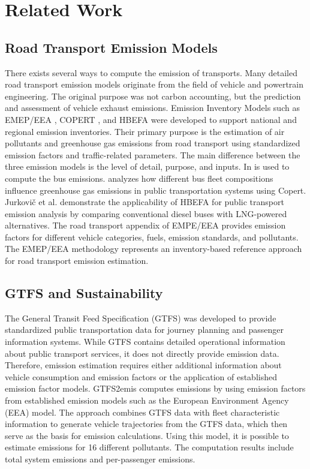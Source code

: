 \chapter{Related Work}
\label{chap:related_work}



\section{Road Transport Emission Models}
There exists several ways to compute the emission of transports. Many detailed road transport emission models originate from the field of vehicle and powertrain engineering. The original purpose was not carbon accounting, but the prediction and assessment of vehicle exhaust emissions. 
Emission Inventory Models such as EMEP/EEA \cite{emep_eea_guidebook_2023}, COPERT \cite{copert}, and HBEFA \cite{hbefa42} were developed to support national and regional emission inventories. Their primary purpose is the estimation of air pollutants and greenhouse gas emissions from road transport using standardized emission factors and traffic-related parameters. The main difference between the three emission models is the level of detail, purpose, and inputs.
In \cite{copertli} is used to compute the bus emissions.  \cite{copertjaworski} analyzes how different bus fleet compositions influence greenhouse gas emissions in public transportation systems using Copert. Jurkovič et al. \cite{jurkovic2020lng} demonstrate the applicability of HBEFA for public transport emission analysis by comparing conventional diesel buses with LNG-powered alternatives. The road transport appendix\cite{emep_eea_road_transport_appendix_2025}  of EMPE/EEA provides emission factors for different vehicle categories, fuels, emission standards, and pollutants. The EMEP/EEA methodology represents an inventory-based reference approach for road transport emission estimation. 



\section{GTFS and Sustainability}
The General Transit Feed Specification (GTFS) was developed to provide standardized public transportation data for journey planning and passenger information systems. While GTFS contains detailed operational information about public transport services, it does not directly provide emission data. Therefore, emission estimation requires either additional information about vehicle consumption and emission factors or the application of established emission factor models.
GTFS2emis \cite{GTFS2Emis} computes emissions by using emission factors from established emission models such as the European Environment Agency (EEA) model. The approach combines GTFS data with fleet characteristic information to generate vehicle trajectories from the GTFS data, which then serve as the basis for emission calculations. Using this model, it is possible to estimate emissions for 16 different pollutants. The computation results include total system emissions and per-passenger emissions.



